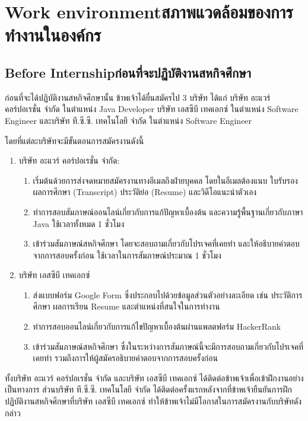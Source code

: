\chapter{\ifenglish Work environment\else สภาพแวดล้อมของการทำงานในองค์กร\fi}

\section{\ifenglish Before Internship\else ก่อนที่จะปฏิบัติงานสหกิจศึกษา\fi}
ก่อนที่จะได้ปฏิบัติงานสหกิจศึกษานั้น ข้าพเจ้าได้ยื่นสมัครไป 3 บริษัท ได้แก่ บริษัท อะแวร์ คอร์ปอเรชั่น จำกัด ในตำแหน่ง Java Developer บริษัท เอสซีบี เทคเอกซ์ ในตำแหน่ง Software Engineer และบริษัท ที.ซี.ซี. เทคโนโลยี จำกัด ในตำแหน่ง Software Engineer 

โดยที่แต่ละบริษัทจะมีขั้นตอนการสมัครงานดังนี้
\begin{enumerate}
    \item บริษัท อะแวร์ คอร์ปอเรชั่น จำกัด: 
    \begin{enumerate}
        \item เริ่มต้นด้วยการส่งจดหมายสมัครงานทางอีเมลถึงฝ่ายบุคคล โดยในอีเมลต้องแนบ ใบรับรองผลการศึกษา (Transcript) ประวัติย่อ (Resume) และวิดีโอแนะนำตัวเอง
        \item ทำการสอบสัมภาษณ์ออนไลน์เกี่ยวกับการแก้ปัญหาเบื้องต้น และความรู้พื้นฐานเกี่ยวกับภาษา Java ใช้เวลาทั้งหมด 1 ชั่วโมง
        \item เข้าร่วมสัมภาษณ์สหกิจศึกษา โดยจะสอบถามเกี่ยวกับโปรเจคที่เคยทำ และให้อธิบายคำตอบจากการสอบครั้งก่อน ใช้เวลาในการสัมภาษณ์ประมาณ 1 ชั่วโมง
    \end{enumerate}
    \item บริษัท เอสซีบี เทคเอกซ์
    \begin{enumerate}
        \item ส่งแบบฟอร์ม Google Form ซึ่งประกอบไปด้วยข้อมูลส่วนตัวอย่างละเอียด เช่น ประวัติการศึกษา ผลการเรียน Resume และตำแหน่งที่สนใจในการทำงาน
        \item ทำการสอบออนไลน์เกี่ยวกับการแก้ไขปัญหาเบื้องต้นผ่านแพลตฟอร์ม HackerRank
        \item เข้าร่วมสัมภาษณ์สหกิจศึกษา ซึ่งในระหว่างการสัมภาษณ์นี้จะมีการสอบถามเกี่ยวกับโปรเจคที่เคยทำ รวมถึงการให้ผู้สมัครอธิบายคำตอบจากการสอบครั้งก่อน
    \end{enumerate}
\end{enumerate}
ทั้งบริษัท อะแวร์ คอร์ปอเรชั่น จำกัด และบริษัท เอสซีบี เทคเอกซ์ ได้ติดต่อข้าพเจ้าเพื่อเข้าฝึกงานอย่างเป็นทางการ ส่วนบริษัท ที.ซี.ซี. เทคโนโลยี จำกัด ได้ติดต่อครั้งแรกหลังจากที่ข้าพเจ้ายืนยันการฝึกปฏิบัติงานสหกิจศึกษาที่บริษัท เอสซีบี เทคเอกซ์ ทำให้ข้าพเจ้าไม่มีโอกาสในการสมัครงานกับบริษัทดังกล่าว
